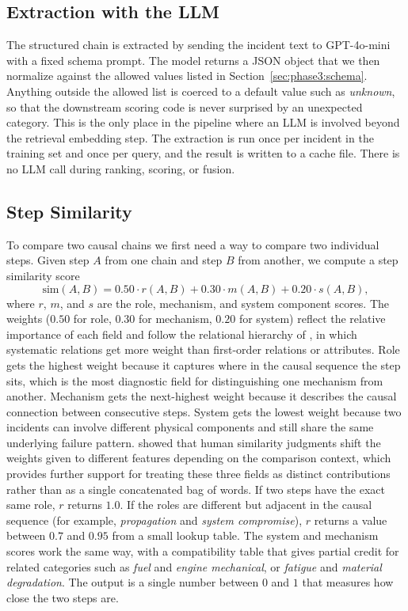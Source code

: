 \documentclass[11pt]{article}
\begin{document}
\subsection{Extraction with the LLM}
\label{sec:phase3:extract}

The structured chain is extracted by sending the incident text to GPT-4o-mini with a fixed schema prompt. The model returns a JSON object that we then normalize against the allowed values listed in Section~\ref{sec:phase3:schema}. Anything outside the allowed list is coerced to a default value such as \emph{unknown}, so that the downstream scoring code is never surprised by an unexpected category. This is the only place in the pipeline where an LLM is involved beyond the retrieval embedding step. The extraction is run once per incident in the training set and once per query, and the result is written to a cache file. There is no LLM call during ranking, scoring, or fusion.

\subsection{Step Similarity}
\label{sec:phase3:step}

To compare two causal chains we first need a way to compare two individual steps. Given step $A$ from one chain and step $B$ from another, we compute a step similarity score
\begin{equation}
\text{sim}(A, B) = 0.50 \cdot r(A, B) + 0.30 \cdot m(A, B) + 0.20 \cdot s(A, B),
\label{eq:step_sim}
\end{equation}
where $r$, $m$, and $s$ are the role, mechanism, and system component scores. The weights ($0.50$ for role, $0.30$ for mechanism, $0.20$ for system) reflect the relative importance of each field and follow the relational hierarchy of \citet{Gentner1983}, in which systematic relations get more weight than first-order relations or attributes. Role gets the highest weight because it captures where in the causal sequence the step sits, which is the most diagnostic field for distinguishing one mechanism from another. Mechanism gets the next-highest weight because it describes the causal connection between consecutive steps. System gets the lowest weight because two incidents can involve different physical components and still share the same underlying failure pattern. \citet{SpencerSmithGoldstone1997} showed that human similarity judgments shift the weights given to different features depending on the comparison context, which provides further support for treating these three fields as distinct contributions rather than as a single concatenated bag of words. If two steps have the exact same role, $r$ returns $1.0$. If the roles are different but adjacent in the causal sequence (for example, \emph{propagation} and \emph{system compromise}), $r$ returns a value between $0.7$ and $0.95$ from a small lookup table. The system and mechanism scores work the same way, with a compatibility table that gives partial credit for related categories such as \emph{fuel} and \emph{engine mechanical}, or \emph{fatigue} and \emph{material degradation}. The output is a single number between $0$ and $1$ that measures how close the two steps are.
\end{document}
